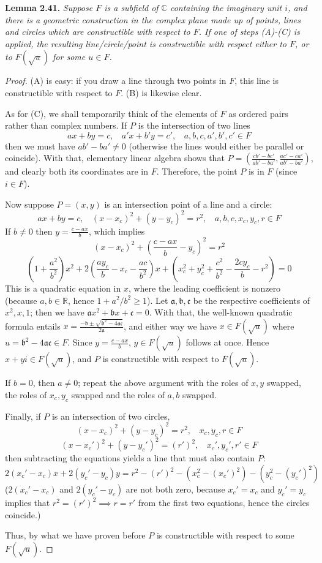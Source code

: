 \documentclass[leqno]{book}
\begin{document}
\noindent\textbf{Lemma 2.41.} \emph{Suppose $F$ is a subfield of $\mathbb C$ containing the imaginary unit $i$, and there is a geometric construction in the complex plane made up of points, lines and circles which are constructible with respect to $F$.  If one of steps (A)-(C) is applied, the resulting line/circle/point is constructible with respect either to $F$, or to $F(\sqrt u)$ for some $u\in F$.}
\begin{proof}
(A) is easy: if you draw a line through two points in $F$, this line is constructible with respect to $F$.  (B) is likewise clear.

As for (C), we shall temporarily think of the elements of $F$ as ordered pairs rather than complex numbers.  If $P$ is the intersection of two lines
$$ax+by=c,~~~~a'x+b'y=c',~~~~a,b,c,a',b',c'\in F$$
then we must have $ab'-ba'\ne 0$ (otherwise the lines would either be parallel or coincide).  With that, elementary linear algebra shows that $P=\left(\frac{cb'-bc'}{ab'-ba'},\frac{ac'-ca'}{ab'-ba'}\right)$, and clearly both its coordinates are in $F$.  Therefore, the point $P$ is in $F$ (since $i\in F$).

Now suppose $P=(x,y)$ is an intersection point of a line and a circle:
$$ax+by=c,~~~~(x-x_c)^2+(y-y_c)^2=r^2,~~~~a,b,c,x_c,y_c,r\in F$$
If $b\ne 0$ then $y=\frac{c-ax}b$, which implies
$$(x-x_c)^2+\left(\frac{c-ax}b-y_c\right)^2=r^2$$
$$\left(1+\frac{a^2}{b^2}\right)x^2+2\left(\frac{ay_c}b-x_c-\frac{ac}{b^2}\right)x+\left(x_c^2+y_c^2+\frac{c^2}{b^2}-\frac{2cy_c}b-r^2\right)=0$$
This is a quadratic equation in $x$, where the leading coefficient is nonzero (because $a,b\in\mathbb R$, hence $1+a^2/b^2\geqslant 1$).  Let $\mathfrak a,\mathfrak b,\mathfrak c$ be the respective coefficients of $x^2,x,1$; then we have $\mathfrak ax^2+\mathfrak bx+\mathfrak c=0$.  With that, the well-known quadratic formula entails $x=\frac{-\mathfrak b\pm\sqrt{\mathfrak b^2-4\mathfrak a\mathfrak c}}{2\mathfrak a}$, and either way we have $x\in F(\sqrt u)$ where $u=\mathfrak b^2-4\mathfrak a\mathfrak c\in F$.  Since $y=\frac{c-ax}b$, $y\in F(\sqrt u)$ follows at once.  Hence $x+yi\in F(\sqrt u)$, and $P$ is constructible with respect to $F(\sqrt u)$.

If $b=0$, then $a\ne 0$; repeat the above argument with the roles of $x,y$ swapped, the roles of $x_c,y_c$ swapped and the roles of $a,b$ swapped.

Finally, if $P$ is an intersection of two circles,
$$(x-x_c)^2+(y-y_c)^2=r^2,~~~~x_c,y_c,r\in F$$
$$(x-x_c')^2+(y-y_c')^2=(r')^2,~~~~x_c',y_c',r'\in F$$
then subtracting the equations yields a line that must also contain $P$:
$$2(x_c'-x_c)x+2(y_c'-y_c)y=r^2-(r')^2-(x_c^2-(x_c')^2)-(y_c^2-(y_c')^2)$$
($2(x_c'-x_c)$ and $2(y_c'-y_c)$ are not both zero, because $x_c'=x_c$ and $y_c'=y_c$ implies that $r^2=(r')^2\implies r=r'$ from the first two equations, hence the circles coincide.)

Thus, by what we have proven before $P$ is constructible with respect to some $F(\sqrt u)$.
\end{proof}
\end{document}
